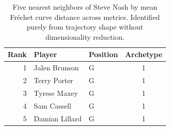 \begin{table}[htbp]
  \centering\small
  \begin{tabular}{rllc}
    \toprule
    Rank & Player & Position & Archetype \\
    \midrule
    1 & Jalen Brunson & G & 1 \\
    2 & Terry Porter & G & 1 \\
    3 & Tyrese Maxey & G & 1 \\
    4 & Sam Cassell & G & 1 \\
    5 & Damian Lillard & G & 1 \\
    \bottomrule
  \end{tabular}
  \caption{Five nearest neighbors of Steve Nash by mean Fr\'{e}chet curve distance across metrics. Identified purely from trajectory shape without dimensionality reduction.}
  \label{tab:Steve_Nash_frechet_curve_neighbors}
\end{table}

